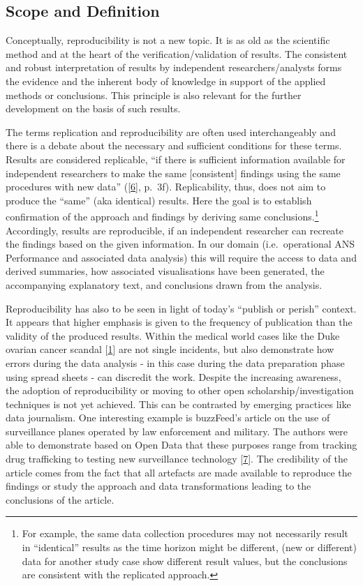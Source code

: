 \documentclass[conference,final,a4paper,]{IEEEtran}
\begin{document}
\hypertarget{scope-and-definition}{%
\subsection{Scope and Definition}\label{scope-and-definition}}

Conceptually, reproducibility is not a new topic.
It is as old as the scientific method and at the heart of the verification/validation of results.
The consistent and robust interpretation of results by independent researchers/analysts forms the evidence and the inherent body of knowledge in support of the applied methods or conclusions.
This principle is also relevant for the further development on the basis of such results.

The terms replication and reproducibility are often used interchangeably and there is a debate about the necessary and sufficient conditions for these terms.
Results are considered replicable, ``if there is sufficient information available for independent researchers to make the same {[}consistent{]} findings using the same procedures with new data'' ({[}\protect\hyperlink{ref-gandrud_2015}{6}{]}, p.~3f).
Replicability, thus, does not aim to produce the ``same'' (aka identical) results. Here the goal is to establish confirmation of the approach and findings by deriving same conclusions.\footnote{For example, the same data collection procedures may not necessarily result in ``identical'' results as the time horizon might be different, (new or different) data for another study case show different result values, but the conclusions are consistent with the replicated approach.}
Accordingly, results are reproducible, if an independent researcher can recreate the findings based on the given information. In our domain (i.e.~operational ANS Performance and associated data analysis) this will require the access to data and derived summaries, how associated visualisations have been generated, the accompanying explanatory text, and conclusions drawn from the analysis.

Reproducibility has also to be seen in light of today's ``publish or perish'' context. It appears that higher emphasis is given to the frequency of publication than the validity of the produced results. Within the medical world cases like the Duke ovarian cancer scandal {[}\protect\hyperlink{ref-kolata_2011}{1}{]} are not single incidents, but also demonstrate how errors during the data analysis - in this case during the data preparation phase using spread sheets - can discredit the work.
Despite the increasing awareness, the adoption of reproducibility or moving to other open scholarship/investigation techniques is not yet achieved.
This can be contrasted by emerging practices like data journalism. One interesting example is buzzFeed's article on the use of surveillance planes operated by law enforcement and military. The authors were able to demonstrate based on Open Data that these purposes range from tracking drug trafficking to testing new surveillance technology {[}\protect\hyperlink{ref-peteraldhous_2016}{7}{]}. The credibility of the article comes from the fact that all artefacts are made available to reproduce the findings or study the approach and data transformations leading to the conclusions of the article.
\end{document}
